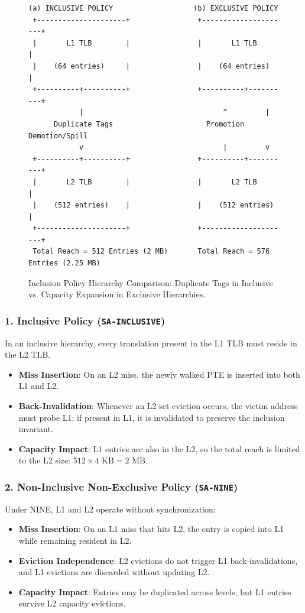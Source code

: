 \begin{figure}[H]
\centering
\begin{lstlisting}[basicstyle=\ttfamily\scriptsize,frame=single]
 (a) INCLUSIVE POLICY                   (b) EXCLUSIVE POLICY
 +---------------------+                +---------------------+
 |       L1 TLB        |                |       L1 TLB        |
 |    (64 entries)     |                |    (64 entries)     |
 +----------+----------+                +----------+----------+
            |                                 ^         |
      Duplicate Tags                      Promotion     Demotion/Spill
            v                                 |         v
 +----------+----------+                +----------+----------+
 |       L2 TLB        |                |       L2 TLB        |
 |    (512 entries)    |                |    (512 entries)    |
 +---------------------+                +---------------------+
 Total Reach = 512 Entries (2 MB)       Total Reach = 576 Entries (2.25 MB)
\end{lstlisting}
\caption{Inclusion Policy Hierarchy Comparison: Duplicate Tags in Inclusive vs. Capacity Expansion in Exclusive Hierarchies.}
\label{fig:inclusion_diagram}
\end{figure}

\subsubsection{1. Inclusive Policy (\texttt{SA-INCLUSIVE})}
In an inclusive hierarchy, every translation present in the L1 TLB must reside in the L2 TLB.
\begin{itemize}
    \item \textbf{Miss Insertion}: On an L2 miss, the newly walked PTE is inserted into both L1 and L2.
    \item \textbf{Back-Invalidation}: Whenever an L2 set eviction occurs, the victim address must probe L1; if present in L1, it is invalidated to preserve the inclusion invariant.
    \item \textbf{Capacity Impact}: L1 entries are also in the L2, so the total reach is limited to the L2 size: $512 \times 4\text{ KB} = 2\text{ MB}$.
\end{itemize}

\subsubsection{2. Non-Inclusive Non-Exclusive Policy (\texttt{SA-NINE})}
Under NINE, L1 and L2 operate without synchronization:
\begin{itemize}
    \item \textbf{Miss Insertion}: On an L1 miss that hits L2, the entry is copied into L1 while remaining resident in L2.
    \item \textbf{Eviction Independence}: L2 evictions do not trigger L1 back-invalidations, and L1 evictions are discarded without updating L2.
    \item \textbf{Capacity Impact}: Entries may be duplicated across levels, but L1 entries survive L2 capacity evictions.
\end{itemize}

